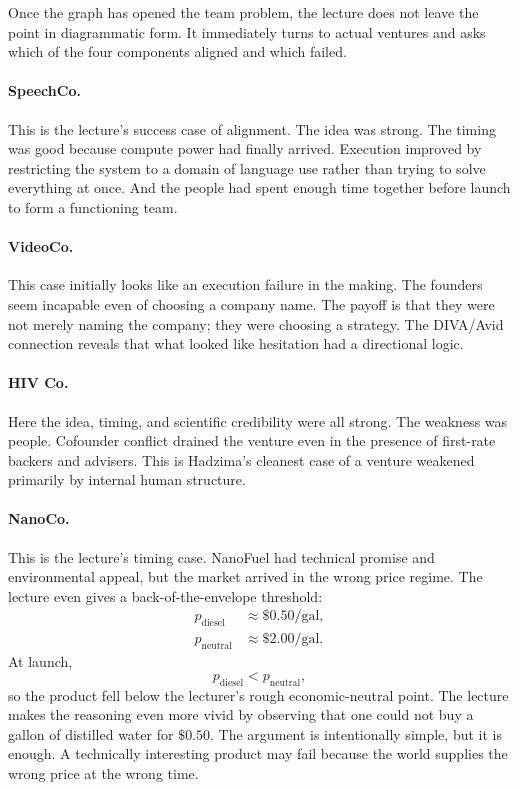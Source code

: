 Once the graph has opened the team problem, the lecture does not leave the point in diagrammatic form. It immediately turns to actual ventures and asks which of the four components aligned and which failed.

\paragraph{SpeechCo.} This is the lecture's success case of alignment. The idea was strong. The timing was good because compute power had finally arrived. Execution improved by restricting the system to a domain of language use rather than trying to solve everything at once. And the people had spent enough time together before launch to form a functioning team.

\paragraph{VideoCo.} This case initially looks like an execution failure in the making. The founders seem incapable even of choosing a company name. The payoff is that they were not merely naming the company; they were choosing a strategy. The DIVA/Avid connection reveals that what looked like hesitation had a directional logic.

\paragraph{HIV Co.} Here the idea, timing, and scientific credibility were all strong. The weakness was people. Cofounder conflict drained the venture even in the presence of first-rate backers and advisers. This is Hadzima's cleanest case of a venture weakened primarily by internal human structure.

\paragraph{NanoCo.} This is the lecture's timing case. NanoFuel had technical promise and environmental appeal, but the market arrived in the wrong price regime. The lecture even gives a back-of-the-envelope threshold:
\begin{align}
p_{\text{diesel}} &\approx \$0.50/\text{gal}, \\
p_{\text{neutral}} &\approx \$2.00/\text{gal}.
\end{align}
At launch,
\begin{equation}
p_{\text{diesel}}<p_{\text{neutral}},
\end{equation}
so the product fell below the lecturer's rough economic-neutral point. The lecture makes the reasoning even more vivid by observing that one could not buy a gallon of distilled water for \(\$0.50\). The argument is intentionally simple, but it is enough. A technically interesting product may fail because the world supplies the wrong price at the wrong time.

